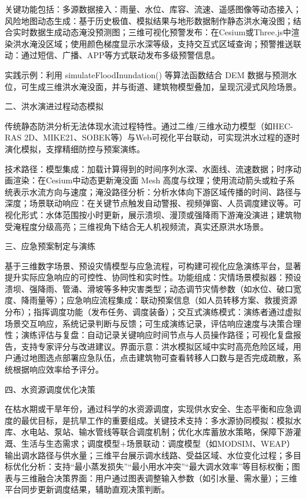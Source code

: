 关键功能包括：多源数据接入：雨量、水位、库容、流速、遥感图像等动态接入；风险地图动态生成：基于历史极值、模拟结果与地形数据制作静态洪水淹没图；结合实时数据生成动态淹没预测图；三维可视化预警发布：在Cesium或Three.js中渲染洪水淹没区域；使用颜色梯度显示水深等级，支持交互式区域查询；预警推送联动：通过短信、广播、APP等方式联动发布多级预警信息。

实践示例：利用 simulateFloodInundation() 等算法函数结合 DEM 数据与预测水位，可生成三维洪水淹没面，并与街道、建筑物模型叠加，呈现沉浸式风险场景。

二、洪水演进过程动态模拟

传统静态防洪分析无法体现水流过程特性。通过二维/三维水动力模型（如HEC-RAS 2D、MIKE21、SOBEK等）与Web可视化平台联动，可实现洪水过程的逐时演化模拟，支撑精细防控与预案演练。

技术路径：模型集成：加载计算得到的时间序列水深、水面线、流速数据；时序动画渲染：在Cesium中动态更新淹没面 Mesh 高度与纹理；使用流动箭头或粒子系统表示水流方向与速度；淹没路径分析：分析水体向下游区域传播的时间、路径与深度；场景联动响应：在关键节点触发自动警报、视频弹窗、人员调度建议等。可视化形式：水体范围按小时更新，展示溃坝、漫顶或强降雨下游淹没演进；建筑物受淹程度分级高亮；三维视角下结合无人机视频流，真实还原洪水场景。

三、应急预案制定与演练

基于三维数字场景、预设灾情模型与应急流程，可构建可视化应急演练平台，显著提升实际应急响应的可控性、协同性和实时性。功能组成：灾情场景模拟器：预设溃坝、强降雨、管涌、滑坡等多种灾害类型；动态调节灾情参数（如水位、破口宽度、降雨量等）；应急响应流程集成：联动预案信息（如人员转移方案、救援资源分布）；指挥调度功能（发布任务、调度装备）；交互式演练模式：演练者通过虚拟场景交互响应，系统记录判断与反馈；可生成演练记录，评估响应速度与决策合理性；演练评估与复盘：自动记录关键响应时间节点与人员操作路径；可视化复盘报告，支持专家评分与改进建议。界面示意：洪水模拟区域中实时高亮危险区域，用户通过地图选点部署应急队伍，点击建筑物可查看转移人口数与是否完成疏散，系统根据响应效率给予评分。

四、水资源调度优化决策

在枯水期或干旱年份，通过科学的水资源调度，实现供水安全、生态平衡和应急调度的最优目标，是抗旱工作的重要组成。关键技术支持：多水源协同模拟：模拟水库、水电站、泵站、输水管线等联合调度机制；优化水库蓄放水策略，保障下游灌溉、生活与生态需求；调度模型+场景联动：调度模型（如MODSIM、WEAP）输出调水路径与供水量；三维平台展示调水线路、受益区域、水位变化过程；多目标优化分析：支持``最小蒸发损失''``最小用水冲突''``最大调水效率''等目标权衡；图表与三维融合决策界面：用户通过图表调整输入参数（如引水量、需水量）；三维平台同步更新调度结果，辅助直观决策判断。

